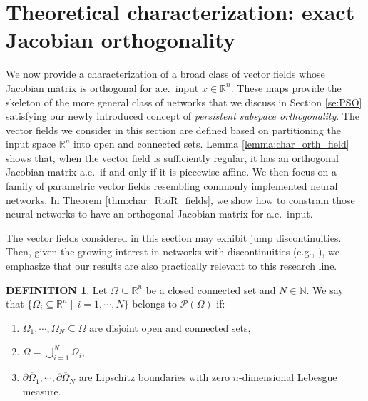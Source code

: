 \documentclass{article}
\newcommand{\R}{\mathbb{R}}
\theoremstyle{plain}
\theoremstyle{definition}
\newtheorem{definition}[theorem]{DEFINITION}
\theoremstyle{definition}
\theoremstyle{remark}
\theoremstyle{definition}
\theoremstyle{definition}
\theoremstyle{remark}
\numberwithin{equation}{section}
\begin{document}
\section{Theoretical characterization: exact Jacobian orthogonality}\label{se:theory}
We now provide a characterization of a broad class of vector fields whose Jacobian matrix is orthogonal for a.e.\, input $x\in\mathbb{R}^n$. These maps provide the skeleton of the more general class of networks that we discuss in Section \ref{se:PSO} satisfying our newly introduced concept of \textit{persistent subspace orthogonality}. The vector fields we consider in this section are defined based on partitioning the input space $\mathbb{R}^n$ into open and connected sets. Lemma \ref{lemma:char_orth_field} shows that, when the vector field is sufficiently regular, it has an orthogonal Jacobian matrix a.e.\, if and only if it is piecewise affine. We then focus on a family of parametric vector fields resembling commonly implemented neural networks. In Theorem \ref{thm:char_RtoR_fields}, we show how to constrain those neural networks to have an orthogonal Jacobian matrix for a.e.\, input.

The vector fields considered in this section may exhibit jump discontinuities. Then, given the growing interest in networks with discontinuities (e.g., \cite{kong2025expressivity,della2023discontinuous,yin2018understanding}), we emphasize that our results are also practically relevant to this research line.

\begin{definition}\label{ass:partition}
Let $\Omega\subseteq\mathbb{R}^n$ be a closed connected set and $N\in\mathbb{N}$. We say that $\{\Omega_i\subseteq\R^n\mid\,i = 1,\cdots,N\}$ belongs to $\mathcal{P}(\Omega)$ if:
\begin{enumerate}
\item $\Omega_1,\cdots,\Omega_N \subseteq \Omega$ are disjoint open and connected sets,
\item $ \Omega = \bigcup_{i = 1}^{N} \overline{\Omega}_i$,
\item $\partial {\overline{\Omega}_1},\cdots,\partial {\overline{\Omega}_N}$ are Lipschitz boundaries with zero $n$-dimensional Lebesgue measure.
\end{enumerate}
\end{definition}
\end{document}
